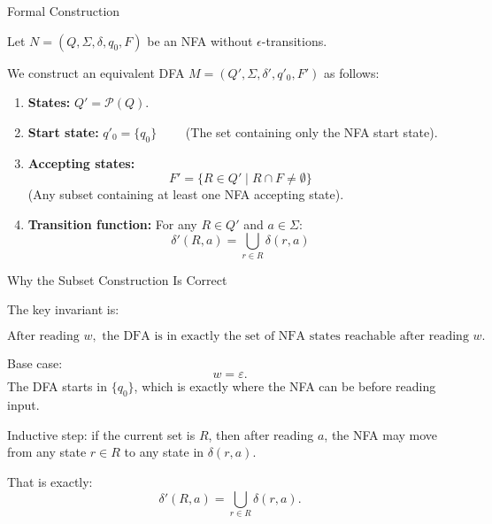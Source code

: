 \documentclass[10pt,aspectratio=169]{beamer}
\newcommand{\eps}{\varepsilon}
\newcommand{\powset}[1]{\mathcal P({#1})}
\begin{document}
\begin{frame}{Formal Construction}

Let $N = (Q, \Sigma, \delta, q_0, F)$ be an NFA without $\epsilon$-transitions. 

We construct an equivalent DFA $M = (Q', \Sigma, \delta', q'_0, F')$ as follows:

\vspace{1em}

\begin{enumerate}
\item \textbf{States:} $Q' = \powset{Q}$.
\item \textbf{Start state:} $q'_0 = \{q_0\} \qquad$
(The set containing only the NFA start state).
\item \textbf{Accepting states:} 
\[
F' = \{ R \in Q' \mid R \cap F \neq \emptyset \}
\]
(Any subset containing at least one NFA accepting state).
\item \textbf{Transition function:} For any $R \in Q'$ and $a \in \Sigma$:
\[
\delta'(R, a) = \bigcup_{r \in R} \delta(r, a)
\]
\end{enumerate}

\end{frame}

\begin{frame}{Why the Subset Construction Is Correct}

\small
The key invariant is:

\[
\text{After reading }w,\text{ the DFA is in exactly the set of NFA states reachable after reading }w.
\]

\vspace{0.8em}
Base case:
\[
w=\eps.
\]
The DFA starts in \(\{q_0\}\), which is exactly where the NFA can be before reading input.

\vspace{0.8em}
Inductive step:
if the current set is \(R\), then after reading \(a\), the NFA may move from any state \(r\in R\) to any state in \(\delta(r,a)\).

\vspace{0.5em}
That is exactly:
\[
\delta'(R,a)=\bigcup_{r\in R}\delta(r,a).
\]

\end{frame}
\end{document}
